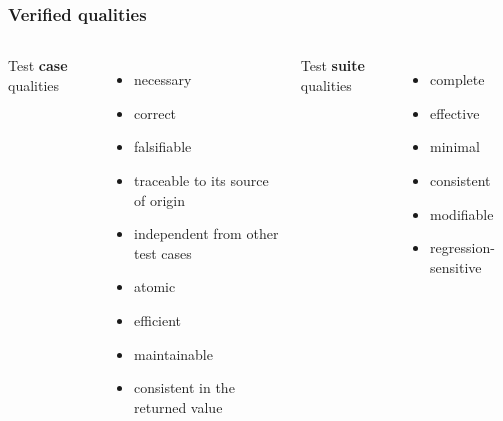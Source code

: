 \documentclass{beamer}
\begin{document}
\begin{frame}
  \frametitle{Verified qualities}
\begin{columns}[t]
\centering \large Test \textbf{case} qualities
\begin{itemize}
  \item necessary
  \item correct
  \item falsifiable
  \item traceable to its source of origin
  \item independent from other test cases
  \item atomic
  \item efficient
  \item maintainable
  \item consistent in the returned value
\end{itemize}
\centering \large Test \textbf{suite} qualities
\begin{itemize}
  \item complete
  \item effective
  \item minimal
  \item consistent
  \item modifiable
  \item regression-sensitive
\end{itemize}
\end{columns}
\end{frame}
 
\end{document}
